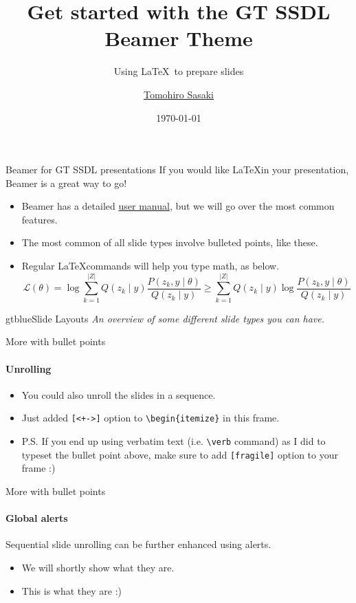 \documentclass{beamer}
\title{Get started with the GT SSDL Beamer Theme}
\subtitle{Using \LaTeX\ to prepare slides}
\author{\href{mailto:tomohiro.sasaki@gatech.edu}{Tomohiro Sasaki}}
\date{\today}
\newcommand{\hrefcol}[2]{\textcolor{gtbuzzgold}{\href{#1}{#2}}}
\begin{document}
\maketitle



\begin{frame}{Beamer for GT SSDL presentations}
If you would like \LaTeX in your presentation, Beamer is a great way to go!
\begin{itemize}
\item Beamer has a detailed
\hrefcol{https://www.ctan.org/tex-archive/macros/latex/contrib/beamer/doc/beameruserguide.pdf}{user
 manual}, but we will go over the most common features.
\item The most common of all slide types involve bulleted points, like these.
\item Regular \LaTeX commands will help you type math, as below.
\begin{equation*}
\mathcal{L} (\theta) = \log \sum_{k=1}^{\lvert Z \rvert} Q(z_k \mid y) \frac{P( z_k,  y \mid \theta)}{Q(z_k \mid y)} \geq \sum_{k=1}^{\lvert Z \rvert} Q(z_k \mid y) \log \frac{P( z_k,  y \mid \theta)}{Q(z_k \mid y)}
\end{equation*}
\end{itemize}
\end{frame}


\begin{chapter}{gtblue}{Slide Layouts}
\textit{An overview of some different slide types you can have.}
\end{chapter}


\begin{frame}[fragile]{More with bullet points}
\framesubtitle{Unrolling}
\begin{itemize}[<+->]
\item You could also unroll the slides in a sequence.
\item Just added \verb|[<+->]| option to \verb|\begin{itemize}| in this frame.
\item P.S. If you end up using verbatim text (i.e. \verb|\verb| command) as I did to typeset the bullet point above, make sure to add \verb|[fragile]| option to your frame :)
\end{itemize}
\end{frame}


\begin{frame}[fragile]{More with bullet points}
\framesubtitle{Global alerts}
Sequential slide unrolling can be further enhanced using alerts.
\begin{itemize}[<alert@2>]
\item We will shortly show what they are.
\item<2- | alert@2> This is what they are :)
\end{itemize}
\end{frame}
\end{document}
